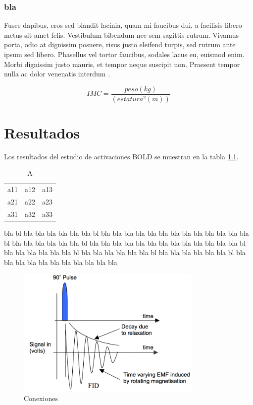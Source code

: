 \documentclass[fisica]{fcfmtesis}
\begin{document}
\subsection{bla}
Fusce dapibus, eros sed blandit lacinia, quam
mi faucibus dui, a facilisis libero metus sit amet felis. Vestibulum bibendum
nec sem sagittis rutrum. Vivamus porta, odio at dignissim posuere, risus justo
eleifend turpis, sed rutrum ante ipsum sed libero. Phasellus vel tortor faucibus,
sodales lacus eu, euismod enim. Morbi dignissim justo mauris, et tempor neque
suscipit non. Praesent tempor nulla ac dolor venenatis interdum \cite{A}.

\begin{equation}
 IMC=\frac{peso (kg)}{(estatura{}^2 (m) )}
\end{equation}

\chapter{Resultados}
Los resultados del estudio de activaciones BOLD se muestran en la tabla \ref{tab:prueba}.

\begin{table}[h]
	\centering
	\caption{A}
	\label{tab:prueba}
	\begin{tabular}{ccc}
	  a11 & a12 & a13 \\
	  a21 & a22 & a23 \\
	  a31 & a32 & a33
	\end{tabular}
\end{table}

 bla bl bla bla bla bla bla bla bl bla bla bla bla bla bla bla bla bla
 bla bla bla bla bl bla bla bla bla bla bla bl bla bla bla bla bla bla
 bla bla bla bla bla bla bla bl bla bla bla bla bla bla bl bla bla bla
 bla bla bla bl bla bla bla bla bla bla bl bla bla bla bla bla bla bla
 bla bla bla bla

\begin{figure}[h]
	\begin{center}
	\includegraphics[width=0.8\textwidth]{radiofrec.png}
	\caption{Conexiones}
	\end{center}
\end{figure}
\end{document}
